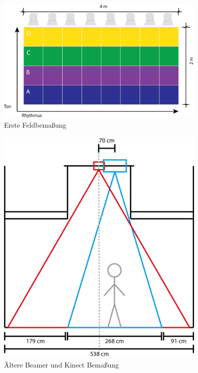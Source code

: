 \begin{figure}[htbp]
	\centering
		\includegraphics[width=0.9\textwidth]{images/TZ1.png}
	\caption{Erste Feldbemaßung}
	\label{fig:TZ1}
\end{figure}

\begin{figure}[htbp]
	\centering
		\includegraphics[width=0.9\textwidth]{images/TZ2.png}
	\caption{Ältere Beamer und Kinect Bemaßung}
	\label{fig:TZ2}
\end{figure}

